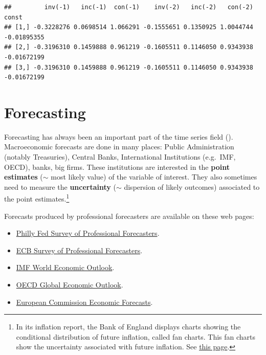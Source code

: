 \documentclass[
  12pt,
]{book}
\providecommand{\tightlist}{%
  \setlength{\itemsep}{0pt}\setlength{\parskip}{0pt}}
\theoremstyle{definition}
\theoremstyle{definition}
\theoremstyle{definition}
\theoremstyle{definition}
\theoremstyle{remark}
\begin{document}
\begin{verbatim}
##         inv(-1)   inc(-1)  con(-1)    inv(-2)   inc(-2)   con(-2)       const
## [1,] -0.3228276 0.0698514 1.066291 -0.1555651 0.1350925 1.0044744 -0.01895355
## [2,] -0.3196310 0.1459888 0.961219 -0.1605511 0.1146050 0.9343938 -0.01672199
## [3,] -0.3196310 0.1459888 0.961219 -0.1605511 0.1146050 0.9343938 -0.01672199
\end{verbatim}

\hypertarget{forecasting}{%
\section{Forecasting}\label{forecasting}}

Forecasting has always been an important part of the time series field (\citet{DEGOOIJER2006443}). Macroeconomic forecasts are done in many places: Public Administration (notably Treasuries), Central Banks, International Institutions (e.g.~IMF, OECD), banks, big firms. These institutions are interested in the \textbf{point estimates} (\(\sim\) most likely value) of the variable of interest. They also sometimes need to measure the \textbf{uncertainty} (\(\sim\) dispersion of likely outcomes) associated to the point estimates.\footnote{In its inflation report, the Bank of England displays charts showing the conditional distribution of future inflation, called fan charts. This fan charts show the uncertainty associated with future inflation. See \href{https://www.bankofengland.co.uk/quarterly-bulletin/1998/q1/the-inflation-report-projections-understanding-the-fan-chart}{this page}.}

Forecasts produced by professional forecasters are available on these web pages:

\begin{itemize}
\tightlist
\item
  \href{https://www.philadelphiafed.org/research-and-data/real-time-center/survey-of-professional-forecasters/}{Philly Fed Survey of Professional Forecasters}.
\item
  \href{http://www.ecb.europa.eu/stats/prices/indic/forecast/html/index.en.html}{ECB Survey of Professional Forecasters}.
\item
  \href{https://www.imf.org/external/pubs/ft/weo/2016/update/01/}{IMF World Economic Outlook}.
\item
  \href{http://www.oecd.org/eco/economicoutlook.htm}{OECD Global Economic Outlook}.
\item
  \href{http://ec.europa.eu/economy_finance/eu/forecasts/index_en.htm}{European Commission Economic Forecasts}.
\end{itemize}
\end{document}
